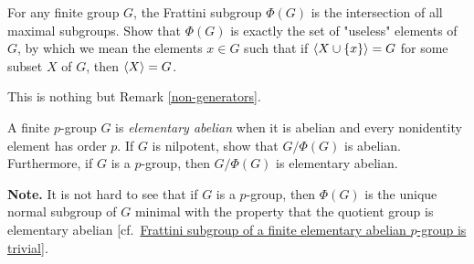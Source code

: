 \begin{probl}
    For any finite group $G$, the Frattini subgroup $\Phi(G)$ is the intersection of all maximal subgroups. Show that\/ $\Phi(G)$ is exactly the set of "useless" elements of\/ $G$, by which we mean the elements\/ $x \in G$ such that if\/ $\langle X \cup\{x\}\rangle = G$ for some subset\/ $X$ of\/ $G$, then $\langle X\rangle = G$.
\end{probl}

\begin{solution} This is nothing but Remark \ref{non-generators}.  \end{solution}

\begin{probl}\label{problem-1.D.8}
    A finite $p$-group\/ $G$ is \textsl{elementary abelian} when it is abelian and every nonidentity element has order\/ $p$. If\/ $G$ is nilpotent, show that $G/\Phi(G)$ is abelian. Furthermore, if\/ $G$ is a $p$-group, then\/ $G/\Phi(G)$ is elementary abelian.

    \textrm{\rm {\bf Note.} It is not hard to see that if $G$ is a $p$-group, then $\Phi(G)$ is the unique normal subgroup of $G$ minimal with the property that the quotient group is elementary abelian [cf.~\href{https://math.stackexchange.com/q/1577150/269050}{Frattini subgroup of a finite elementary abelian $p$-group is trivial}].}
\end{probl}

